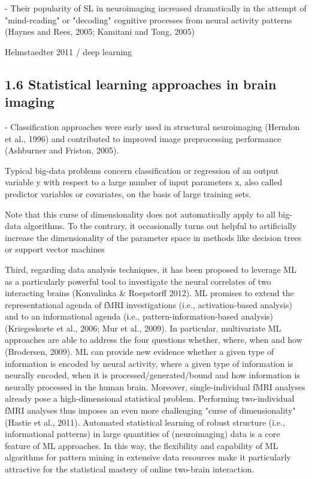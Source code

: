 \documentclass[authoryear,review,3p]{elsarticle}
\begin{document}
- Their popularity of SL in neuroimaging increased dramatically in the attempt of "mind-reading" or "decoding" cognitive processes from neural activity patterns (Haynes and Rees, 2005; Kamitani and Tong, 2005)



Helmstaedter 2011 / deep learning



\subsection*{1.6 Statistical learning approaches in brain imaging}


- Classification approaches were early used in structural neuroimaging (Herndon et al., 1996) and contributed to improved image preprocessing performance (Ashburner and Friston, 2005).





Typical big-data problems concern classification or regression of an output variable y with respect to a large number of input parameters x, also called predictor variables or covariates, on the basis of large training sets. 


Note that this curse of dimensionality does not automatically apply to all big-data algorithms. To the contrary, it occasionally turns out helpful to artificially increase the dimensionality of the parameter space in methods like decision trees or support vector machines 



Third, regarding data analysis techniques, it has been proposed to leverage ML as a particularly powerful tool to investigate the neural correlates of two interacting brains (Konvalinka & Roepstorff 2012). ML promises to extend the representational agenda of fMRI investigations (i.e., activation-based analysis) and to an informational agenda (i.e., pattern-information-based analysis) (Kriegeskorte et al., 2006; Mur et al., 2009). In particular, multivariate ML approaches are able to address the four questions whether, where, when and how (Brodersen, 2009). ML can provide new evidence whether a given type of information is encoded by neural activity, where a given type of information is neurally encoded, when it is processed/generated/bound and how information is neurally processed in the human brain. Moreover, single-individual fMRI analyses already pose a high-dimensional statistical problem. Performing two-individual fMRI analyses thus imposes an even more challenging "curse of dimensionality" (Hastie et al., 2011). Automated statistical learning of robust structure (i.e., informational patterns) in large quantities of (neuroimaging) data is a core feature of ML approaches. In this way, the flexibility and capability of ML algorithms for pattern mining in extensive data resources make it particularly attractive for the statistical mastery of online two-brain interaction.
\end{document}
